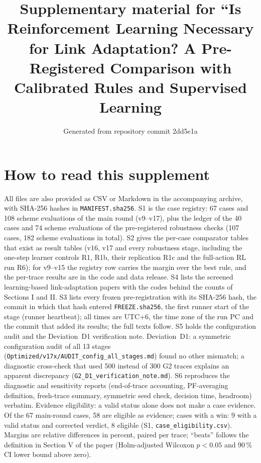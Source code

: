 \documentclass[10pt]{article}
\title{Supplementary material for ``Is Reinforcement Learning Necessary for Link Adaptation? A Pre-Registered Comparison with Calibrated Rules and Supervised Learning}
\date{Generated from repository commit 2dd5e1a}
\begin{document}
\maketitle
\tableofcontents
\clearpage
\section*{How to read this supplement}
All files are also provided as CSV or Markdown in the accompanying archive, with SHA-256 hashes in \texttt{MANIFEST.sha256}. S1 is the case registry: 67 cases and 108 scheme evaluations of the main round (v9--v17), plus the ledger of the 40 cases and 74 scheme evaluations of the pre-registered robustness checks (107 cases, 182 scheme evaluations in total). S2 gives the per-case comparator tables that exist as result tables (v16, v17 and every robustness stage, including the one-step learner controls R1, R1b, their replication R1c and the full-action RL run R6); for v9--v15 the registry row carries the margin over the best rule, and the per-trace results are in the code and data release. S4 lists the screened learning-based link-adaptation papers with the codes behind the counts of Sections I and II. S3 lists every frozen pre-registration with its SHA-256 hash, the commit in which that hash entered \texttt{FREEZE.sha256}, the first runner start of the stage (runner heartbeat); all times are UTC+6, the time zone of the run PC and the commit that added its results; the full texts follow. S5 holds the configuration audit and the Deviation~D1 verification note. Deviation~D1: a symmetric configuration audit of all 13 stages (\texttt{Optimized/v17x/AUDIT\_config\_all\_stages.md}) found no other mismatch; a diagnostic cross-check that used 500 instead of 300 G2 traces explains an apparent discrepancy (\texttt{G2\_D1\_verification\_note.md}). S6 reproduces the diagnostic and sensitivity reports (end-of-trace accounting, PF-averaging definition, fresh-trace summary, symmetric seed check, decision time, headroom) verbatim. Evidence eligibility: a valid status alone does not make a case evidence. Of the 67 main-round cases, 58 are eligible as evidence; cases with a win: 9 with a valid status and corrected verdict, 8 eligible (S1, \texttt{case\_eligibility.csv}). Margins are relative differences in percent, paired per trace; ``beats'' follows the definition in Section V of the paper (Holm-adjusted Wilcoxon $p<0.05$ and 90\,\% CI lower bound above zero).
\clearpage
\end{document}
